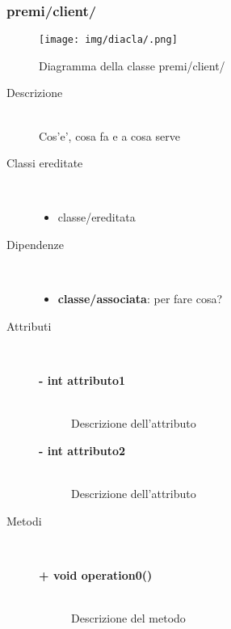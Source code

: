 \subsubsection{premi/client/}
\begin{figure}[h]
\begin{center}
\texttt{[image: img/diacla/.png]}
\caption{Diagramma della classe premi/client/}
\end{center}
\end{figure}


\begin{description}
\item[Descrizione] \hfill \\
	Cos'e', cosa fa e a cosa serve
	
	
\item[Classi ereditate] \hfill \\
	\begin{itemize}
		\item classe/ereditata
	\end{itemize}
	
	
\item[Dipendenze] \hfill \\
	\begin{itemize}
		\item \textbf{classe/associata}: per fare cosa?
	\end{itemize}
	
	
\item[Attributi] \hfill \\
	\begin{description}
		\item[\textbf{- int attributo1			}] \hfill \\
			Descrizione dell'attributo
		\item[\textbf{- int attributo2			}] \hfill \\
			Descrizione dell'attributo
	\end{description}
	
	
\item[Metodi] \hfill \\

	\begin{description}
		\item[\textbf{\color{blue}+ void operation0()			}] \hfill \\
			Descrizione del metodo
			

\end{description}
\end{description}
